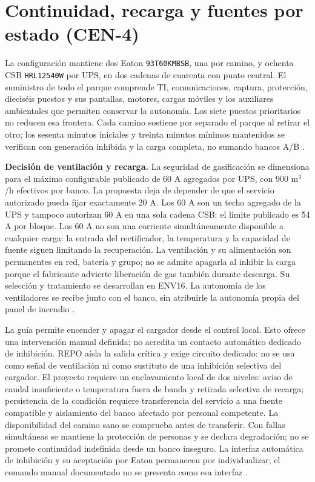 \section{Continuidad, recarga y fuentes por estado (CEN-4)}
\label{sec:sd4-continuidad-cen4}

La configuración mantiene dos Eaton \texttt{93T60KMBSB}, una por camino, y ochenta CSB \texttt{HRL12540W} por UPS, en dos cadenas de cuarenta con punto central. El suministro de todo el parque comprende TI, comunicaciones, captura, protección, dieciséis puestos y sus pantallas, motores, cargas móviles y los auxiliares ambientales que permiten conservar la autonomía. Los siete puestos prioritarios no reducen esa frontera. Cada camino sostiene por separado el parque al retirar el otro; los sesenta minutos iniciales y treinta minutos mínimos mantenidos se verifican con generación inhibida y la carga completa, no sumando bancos A/B \parencites[RT-06.07, p.~15]{pucv-transversal}{p7-eaton-93t-guia}{csbHRL12540WRA260131}.

\textbf{Decisión de ventilación y recarga.} La seguridad de gasificación se dimensiona para el máximo configurable publicado de 60 A agregados por UPS, con 900 m$^3$/h efectivos por banco. La propuesta deja de depender de que el servicio autorizado pueda fijar exactamente 20 A. Los 60 A son un techo agregado de la UPS y tampoco autorizan 60 A en una sola cadena CSB: el límite publicado es 54 A por bloque. Los 60 A no son una corriente simultáneamente disponible a cualquier carga: la entrada del rectificador, la temperatura y la capacidad de fuente siguen limitando la recuperación. La ventilación y su alimentación son permanentes en red, batería y grupo; no se admite apagarla al inhibir la carga porque el fabricante advierte liberación de gas también durante descarga. Su selección y tratamiento se desarrollan en ENV16. La autonomía de los ventiladores se recibe junto con el banco, sin atribuirle la autonomía propia del panel de incendio \parencites[p.~98 y advertencias de seguridad]{p7-eaton-93t-guia}{csbManualJunio2025}.

La guía permite encender y apagar el cargador desde el control local. Esto ofrece una intervención manual definida; no acredita un contacto automático dedicado de inhibición. REPO aísla la salida crítica y exige circuito dedicado: no se usa como señal de ventilación ni como sustituto de una inhibición selectiva del cargador. El proyecto requiere un enclavamiento local de dos niveles: aviso de caudal insuficiente o temperatura fuera de banda y retirada selectiva de recarga; persistencia de la condición requiere transferencia del servicio a una fuente compatible y aislamiento del banco afectado por personal competente. La disponibilidad del camino sano se comprueba antes de transferir. Con fallas simultáneas se mantiene la protección de personas y se declara degradación; no se promete continuidad indefinida desde un banco inseguro. La interfaz automática de inhibición y su aceptación por Eaton permanecen por individualizar; el comando manual documentado no se presenta como esa interfaz \parencite[secc.~6.2 y 6.5]{p7-eaton-93t-guia}.


